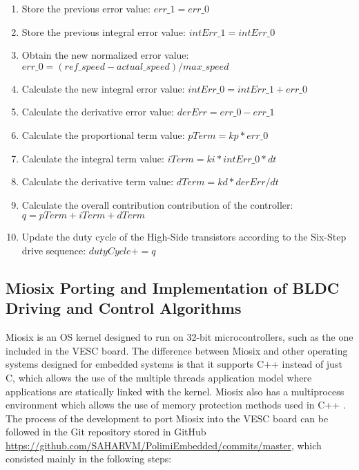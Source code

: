 \begin{enumerate}
\item Store the previous error value: $err\_1 = err\_0$
\item Store the previous integral error value: $intErr\_1 = intErr\_0$
\item Obtain the new normalized error value: $err\_0 = (ref\_speed - actual\_speed) / max\_speed$
\item Calculate the new integral error value: $intErr\_0 = intErr\_1 + err\_0$
\item Calculate the derivative error value: $derErr = err\_0 - err\_1$
\item Calculate the proportional term value: $pTerm = kp * err\_0$
\item Calculate the integral term value: $iTerm = ki * intErr\_0 * dt$
\item Calculate the derivative term value: $dTerm = kd * derErr / dt$
\item Calculate the overall contribution contribution of the controller: $q = pTerm + iTerm + dTerm$
\item Update the duty cycle of the High-Side transistors according to the Six-Step drive sequence: $dutyCycle += q$
\end {enumerate}

\subsection{Miosix Porting and Implementation of BLDC Driving and Control Algorithms}
Miosix is an OS kernel designed to run on 32-bit microcontrollers, such as the one included in the VESC board. The difference between Miosix and other operating systems designed for embedded systems is that it supports C++ instead of just C, which allows the use of the multiple threads application model where applications are statically linked with the kernel. Miosix also has a multiprocess environment which allows the use of memory protection methods used in C++ \cite{MiosixSite}.\\

The process of the development to port Miosix into the VESC board can be followed in the Git repository stored in GitHub \url{https://github.com/SAHARVM/PolimiEmbedded/commits/master}, which consisted mainly in the following steps:

